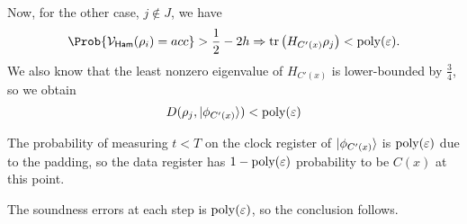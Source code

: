 \begin{prf}
	Now, for the other case, $j\notin J$, we have
	$$\Prob{\cV_\GS(\rho_i)=acc}>\frac{1}{2}-2h\Rightarrow\tr\left(H_{C'(x)}\rho_j\right)<\poly(\varepsilon).$$
	We also know that the least nonzero eigenvalue of $H_{C'(x)}$ is lower-bounded by $\frac{3}{4}$, so we obtain 
	$$D(\rho_j, \ket{\phi_{C'(x)}})<\operatorname*{\operatorname{poly}}(\varepsilon)$$

	The probability of measuring $t<T$ on the clock register of $\ket{\phi_{C'(x)}}$ is $\operatorname*{\operatorname{poly}}(\varepsilon)$ due to the padding,
	so the data register has $1-\operatorname*{\operatorname{poly}}(\varepsilon)$ probability to be $C(x)$ at this point.

	The soundness errors at each step is $\operatorname*{\operatorname{poly}}(\varepsilon)$, so the conclusion follows.
\end{prf}
